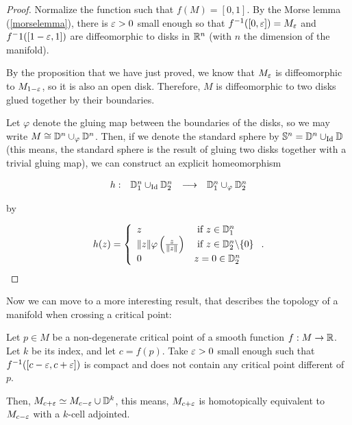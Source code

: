\begin{proof}
Normalize the function such that $f(M) = [0,1]$. By the Morse lemma (\ref{morselemma}), there is $\varepsilon > 0$ small enough so that $f^{-1}([0,\varepsilon]) = M_{\varepsilon}$ and $f^-1([1-\varepsilon,1])$ are diffeomorphic to disks in $\mathbb{R}^n$ (with $n$ the dimension of the manifold).

By the proposition that we have just proved, we know that $M_{\varepsilon}$ is diffeomorphic to $M_{1-\varepsilon}$, so it is also an open disk. Therefore, $M$ is diffeomorphic to two disks glued together by their boundaries.

Let $\varphi$ denote the gluing map between the boundaries of the disks, so we may write $M \cong \mathbb{D}^n \cup_{\varphi} \mathbb{D}^n$. Then, if we denote the standard sphere by $\mathbb{S}^n = \mathbb{D}^n \cup_{\text{Id}} \mathbb{D}$ (this means, the standard sphere is the result of gluing two disks together with a trivial gluing map), we can construct an explicit homeomorphism

$$\begin{array}{rccc} h : & \mathbb{D}_1^n \cup_{\text{Id}} \mathbb{D}_2^n & \longrightarrow & \mathbb{D}_1^n \cup_{\varphi} \mathbb{D}_2^n \end{array}$$

by

$$h(z) = \left\{ \begin{array}{ll} z & \text{ if } z \in \mathbb{D}_1^n \\ \|z\| \varphi\left( \frac{z}{\|z\|} \right) & \text{ if } z \in \mathbb{D}_2^n \backslash \{0\} \\ 0 & z = 0 \in \mathbb{D}_2^n \end{array} \right. .$$
\end{proof}

Now we can move to a more interesting result, that describes the topology of a manifold when crossing a critical point:

\begin{theo}
Let $p \in M$ be a non-degenerate critical point of a smooth function $f : M \rightarrow \mathbb{R}$. Let $k$ be its index, and let $c = f(p)$. Take $\varepsilon > 0$ small enough such that $f^{-1}([c-\varepsilon,c+\varepsilon])$ is compact and does not contain any critical point different of $p$.

Then, $M_{c+\varepsilon} \simeq M_{c-\varepsilon} \cup \mathbb{D}^k$, this means, $M_{c+\varepsilon}$ is homotopically equivalent to $M_{c-\varepsilon}$ with a $k$-cell adjointed.
\end{theo}

